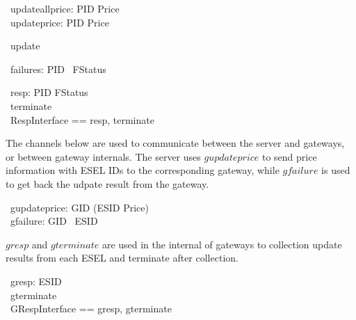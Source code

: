 \begin{circus}
	\circchannel\ updateallprice: PID \pfun Price \\
	\circchannel\ updateprice: PID \pfun Price
\end{circus}

\begin{circus}
	\circchannel\ update
\end{circus}

\begin{circus}
	\circchannel\ failures: PID \pfun \power~FStatus 
\end{circus}

\begin{circus}
	\circchannel\ resp: PID \cross FStatus \\
    \circchannel\ terminate \\
    \circchannelset\ RespInterface == \lchanset resp, terminate \rchanset 
\end{circus}

The channels below are used to communicate between the server and gateways, or between gateway internals. The server uses $gupdateprice$ to send price information with ESEL IDs to the corresponding gateway, while $gfailure$ is used to get back the udpate result from the gateway.
\begin{circus}
	\circchannel\ gupdateprice: GID \cross (ESID \pfun Price) \\
	\circchannel\ gfailure: GID \cross \power~ESID \\
\end{circus}
$gresp$ and $gterminate$ are used in the internal of gateways to collection update results from each ESEL and terminate after collection.
\begin{circus}
	\circchannel\ gresp: ESID \\
	\circchannel\ gterminate \\
    \circchannelset\ GRespInterface == \lchanset gresp, gterminate \rchanset 
\end{circus}

